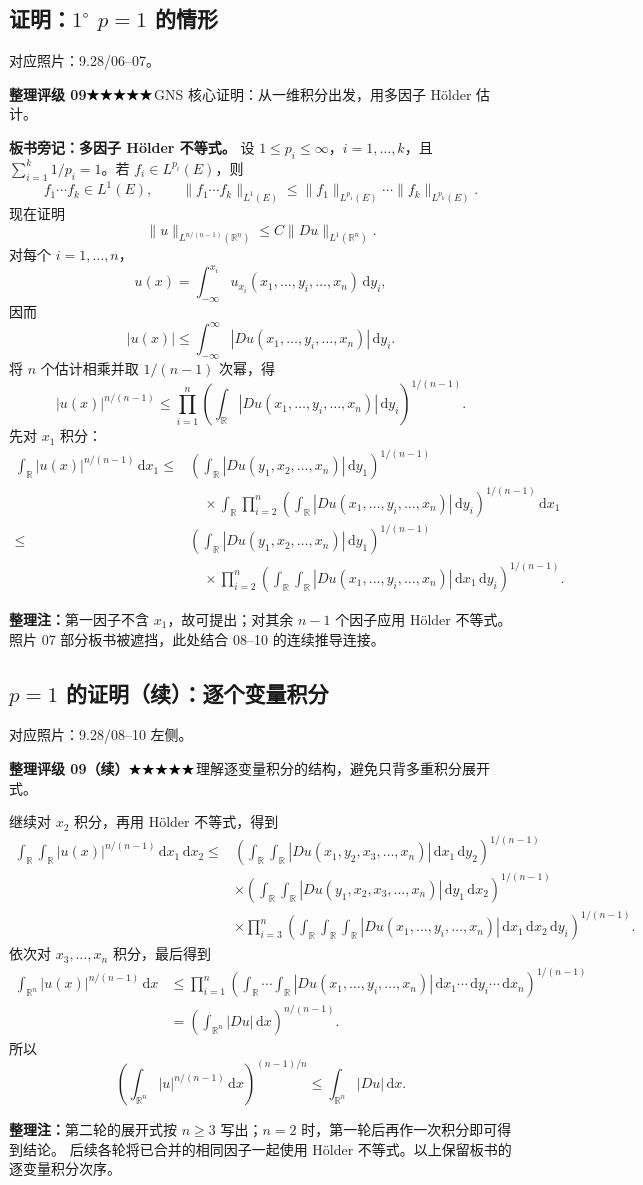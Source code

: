 \documentclass[UTF8,a4paper,11pt,fontset=fandol]{ctexart}
\newcommand{\R}{\mathbb R}
\newcommand{\dd}{\,\mathrm d}
\newcommand{\ednote}[1]{\par{\small\color{notegray}\textbf{整理注：}#1}\par}
\newcommand{\source}[1]{{\small\color{notegray}对应照片：#1。}\par}
\newcommand{\proofstars}[1]{\ensuremath{%
\ifnum#1>0\relax\bigstar\fi
\ifnum#1>1\relax\bigstar\fi
\ifnum#1>2\relax\bigstar\fi
\ifnum#1>3\relax\bigstar\fi
\ifnum#1>4\relax\bigstar\fi}}
\newcommand{\proofrating}[3]{\par{\small\color{proofblue}%
\textbf{整理评级 #1}\enspace\proofstars{#2}\quad #3\par}}
\begin{document}
\subsection*{证明：$1^\circ$ $p=1$ 的情形}
\source{9.28/06--07}
\proofrating{09}{5}{GNS 核心证明：从一维积分出发，用多因子 Hölder 估计。}
\textbf{板书旁记：多因子 Hölder 不等式。}
设 $1\leq p_i\leq\infty$，$i=1,\ldots,k$，且
$\sum_{i=1}^k1/p_i=1$。若 $f_i\in L^{p_i}(E)$，则
\[
f_1\cdots f_k\in L^1(E),\qquad
\|f_1\cdots f_k\|_{L^1(E)}
\leq\|f_1\|_{L^{p_1}(E)}\cdots\|f_k\|_{L^{p_k}(E)}.
\]
现在证明
\[
\|u\|_{L^{n/(n-1)}(\R^n)}\leq C\|Du\|_{L^1(\R^n)}.
\]
对每个 $i=1,\ldots,n$，
\[
u(x)=\int_{-\infty}^{x_i}
u_{x_i}(x_1,\ldots,y_i,\ldots,x_n)\dd y_i,
\]
因而
\[
|u(x)|\leq\int_{-\infty}^{\infty}
|Du(x_1,\ldots,y_i,\ldots,x_n)|\dd y_i.
\]
将 $n$ 个估计相乘并取 $1/(n-1)$ 次幂，得
\[
|u(x)|^{n/(n-1)}
\leq\prod_{i=1}^n
\left(\int_\R|Du(x_1,\ldots,y_i,\ldots,x_n)|\dd y_i\right)^{1/(n-1)}.
\]
先对 $x_1$ 积分：
\[
\begin{aligned}
\int_\R|u(x)|^{n/(n-1)}\dd x_1
\leq{}&
\left(\int_\R|Du(y_1,x_2,\ldots,x_n)|\dd y_1\right)^{1/(n-1)}\\
&\quad\times\int_\R\prod_{i=2}^n
\left(\int_\R|Du(x_1,\ldots,y_i,\ldots,x_n)|\dd y_i\right)^{1/(n-1)}
\dd x_1\\
\leq{}&
\left(\int_\R|Du(y_1,x_2,\ldots,x_n)|\dd y_1\right)^{1/(n-1)}\\
&\quad\times\prod_{i=2}^n
\left(\int_\R\int_\R|Du(x_1,\ldots,y_i,\ldots,x_n)|
\dd x_1\dd y_i\right)^{1/(n-1)}.
\end{aligned}
\]
\ednote{第一因子不含 $x_1$，故可提出；对其余 $n-1$ 个因子应用 Hölder 不等式。
照片 07 部分板书被遮挡，此处结合 08--10 的连续推导连接。}

\newpage
\subsection*{$p=1$ 的证明（续）：逐个变量积分}
\source{9.28/08--10 左侧}
\proofrating{09（续）}{5}{理解逐变量积分的结构，避免只背多重积分展开式。}
继续对 $x_2$ 积分，再用 Hölder 不等式，得到
\[
\begin{aligned}
\int_\R\int_\R|u(x)|^{n/(n-1)}\dd x_1\dd x_2
\leq{}&
\left(\int_\R\int_\R
|Du(x_1,y_2,x_3,\ldots,x_n)|\dd x_1\dd y_2\right)^{1/(n-1)}\\
&\times\left(\int_\R\int_\R
|Du(y_1,x_2,x_3,\ldots,x_n)|\dd y_1\dd x_2\right)^{1/(n-1)}\\
&\times\prod_{i=3}^n
\left(\int_\R\int_\R\int_\R
|Du(x_1,\ldots,y_i,\ldots,x_n)|
\dd x_1\dd x_2\dd y_i\right)^{1/(n-1)}.
\end{aligned}
\]
依次对 $x_3,\ldots,x_n$ 积分，最后得到
\[
\begin{aligned}
\int_{\R^n}|u(x)|^{n/(n-1)}\dd x
&\leq\prod_{i=1}^n
\left(\int_\R\cdots\int_\R
|Du(x_1,\ldots,y_i,\ldots,x_n)|
\dd x_1\cdots\dd y_i\cdots\dd x_n\right)^{1/(n-1)}\\
&=\left(\int_{\R^n}|Du|\dd x\right)^{n/(n-1)}.
\end{aligned}
\]
所以
\[
\boxed{\left(\int_{\R^n}|u|^{n/(n-1)}\dd x\right)^{(n-1)/n}
\leq\int_{\R^n}|Du|\dd x.}
\]
\ednote{第二轮的展开式按 $n\geq3$ 写出；$n=2$ 时，第一轮后再作一次积分即可得到结论。
后续各轮将已合并的相同因子一起使用 Hölder 不等式。以上保留板书的逐变量积分次序。}
\end{document}

